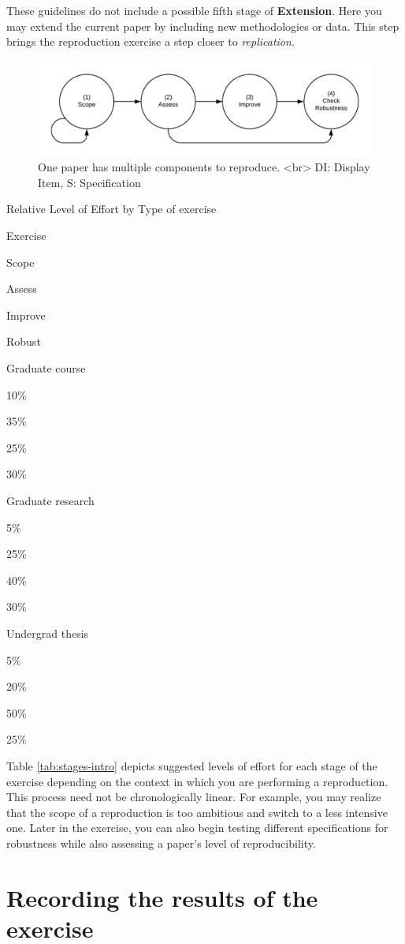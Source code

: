 \documentclass[]{book}
\begin{document}
These guidelines do not include a possible fifth stage of \textbf{Extension}. Here you may extend the current paper by including new methodologies or data. This step brings the reproduction exercise a step closer to \emph{replication}.

\begin{figure}
\includegraphics[width=1\linewidth]{stages} \caption{One paper has multiple components to reproduce. <br> DI: Display Item, S: Specification}\label{fig:stages-intro}
\end{figure}

\label{tab:stages-intro}Relative Level of Effort by Type of exercise

Exercise

Scope

Assess

Improve

Robust

Graduate course

10\%

35\%

25\%

30\%

Graduate research

5\%

25\%

40\%

30\%

Undergrad thesis

5\%

20\%

50\%

25\%

Table \ref{tab:stages-intro} depicts suggested levels of effort for each stage of the exercise depending on the context in which you are performing a reproduction. This process need not be chronologically linear. For example, you may realize that the scope of a reproduction is too ambitious and switch to a less intensive one. Later in the exercise, you can also begin testing different specifications for robustness while also assessing a paper's level of reproducibility.

\hypertarget{recording-the-results-of-the-exercise}{%
\section*{Recording the results of the exercise}\label{recording-the-results-of-the-exercise}}
\end{document}
